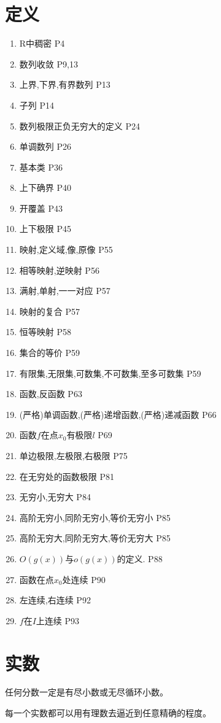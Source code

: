 \documentclass[UTF8]{ctexart}
\begin{document}
\section{定义}
\begin{enumerate}
\item R中稠密 P4
\item 数列收敛 P9,13
\item 上界,下界,有界数列 P13
\item 子列 P14
\item 数列极限正负无穷大的定义 P24
\item 单调数列 P26
\item 基本类 P36
\item 上下确界 P40
\item 开覆盖 P43
\item 上下极限 P45
\item 映射,定义域,像,原像 P55
\item 相等映射,逆映射 P56
\item 满射,单射,一一对应 P57
\item 映射的复合 P57
\item 恒等映射 P58
\item 集合的等价 P59
\item 有限集,无限集,可数集,不可数集,至多可数集 P59
\item 函数,反函数 P63
\item (严格)单调函数,(严格)递增函数,(严格)递减函数 P66
\item 函数$f$在点$x_{0}$有极限$l$ P69
\item 单边极限,左极限,右极限 P75
\item 在无穷处的函数极限 P81
\item 无穷小,无穷大 P84
\item 高阶无穷小,同阶无穷小,等价无穷小 P85
\item 高阶无穷大,同阶无穷大,等价无穷大 P85
\item $O(g(x)) \mbox{与} o(g(x))$的定义. P88
\item 函数在点$x_0$处连续 P90
\item 左连续,右连续 P92
\item $f$在$I$上连续 P93
\end{enumerate}

\section{实数}
任何分数一定是有尽小数或无尽循环小数。
	
每一个实数都可以用有理数去逼近到任意精确的程度。
	
\end{document}
